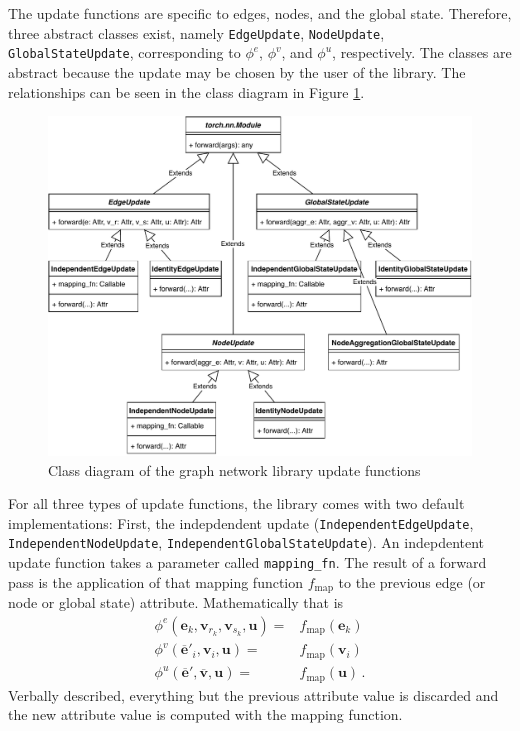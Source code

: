 The update functions are specific to edges, nodes, and the global state. Therefore, three abstract classes exist, namely \texttt{EdgeUpdate}, \texttt{NodeUpdate}, \texttt{GlobalStateUpdate}, corresponding to $\phi^e$, $\phi^v$, and $\phi^u$, respectively. The classes are abstract because the update may be chosen by the user of the library. The relationships can be seen in the class diagram in Figure \ref{fig:classdiagramgnfunctionsupdate}.

\begin{figure}\centering
    \includegraphics[scale=0.65]{resources/graphnets-functions-update}
    \caption{Class diagram of the graph network library update functions}\label{fig:classdiagramgnfunctionsupdate}
\end{figure}

For all three types of update functions, the library comes with two default implementations: First, the indepdendent update (\texttt{IndependentEdgeUpdate}, \texttt{IndependentNodeUpdate}, \texttt{IndependentGlobalStateUpdate}). An indepdentent update function takes a parameter called \texttt{mapping\_fn}. The result of a forward pass is the application of that mapping function $f_\text{map}$ to the previous edge (or node or global state) attribute. Mathematically that is \begin{align}
\phi^e\left(\bm{e}_k,\bm{v}_{r_k},\bm{v}_{s_k},\bm{u}\right)=&f_\text{map}\left(\bm{e}_k\right)\\
\phi^v\left(\bm{\overline{e}}'_i,\bm{v}_i,\bm{u}\right)=&f_\text{map}\left(\bm{v}_i\right)\\
\phi^u\left(\bm{\overline{e}}',\bm{\overline{v}},\bm{u}\right)=&f_\text{map}\left(\bm{u}\right)\,.
\end{align}Verbally described, everything but the previous attribute value is discarded and the new attribute value is computed with the mapping function.

